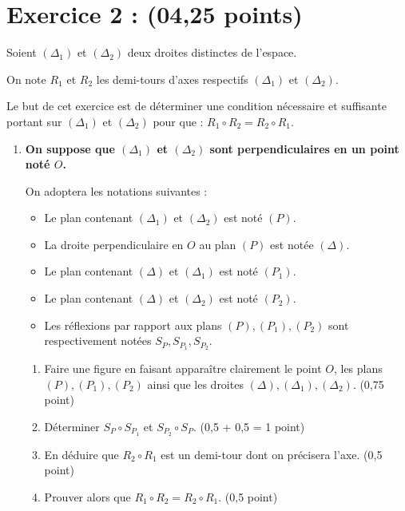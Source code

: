 \documentclass[11pt]{article}
\begin{document}
\section*{Exercice 2 :  (04,25 points)}

Soient \( (\Delta_1) \) et \( (\Delta_2) \) deux droites distinctes de l’espace.

\noindent
On note \( R_1 \) et \( R_2 \) les demi-tours d’axes respectifs \( (\Delta_1) \) et \( (\Delta_2) \).

\medskip
Le but de cet exercice est de déterminer une condition nécessaire et suffisante portant sur \( (\Delta_1) \) et \( (\Delta_2) \) pour que : \( R_1 \circ R_2 = R_2 \circ R_1. \)

\begin{enumerate}
\item \textbf{On suppose que \( (\Delta_1) \) et \( (\Delta_2) \) sont perpendiculaires en un point noté \( O \).}

On adoptera les notations suivantes :
\begin{itemize}
    \item Le plan contenant \( (\Delta_1) \) et \( (\Delta_2) \) est noté \( (P) \).
    \item La droite perpendiculaire en \( O \) au plan \( (P) \) est notée \( (\Delta) \).
    \item Le plan contenant \( (\Delta) \) et \( (\Delta_1) \) est noté \( (P_1) \).
    \item Le plan contenant \( (\Delta) \) et \( (\Delta_2) \) est noté \( (P_2) \).
    \item Les réflexions par rapport aux plans \( (P), (P_1), (P_2) \) sont respectivement notées \( S_P, S_{P_1}, S_{P_2} \).
\end{itemize}

\begin{enumerate}[label=\alph*)]
    \item Faire une figure en faisant apparaître clairement le point \( O \), les plans \( (P), (P_1), (P_2) \) ainsi que les droites \( (\Delta), (\Delta_1), (\Delta_2) \). \hfill (0,75 point)

    \item Déterminer \( S_P \circ S_{P_1} \) et \( S_{P_2} \circ S_P \). \hfill (0,5 + 0,5 = 1 point)

    \item En déduire que \( R_2 \circ R_1 \) est un demi-tour dont on précisera l’axe. \hfill (0,5 point)

    \item Prouver alors que \( R_1 \circ R_2 = R_2 \circ R_1 \). \hfill (0,5 point)
\end{enumerate}


\end{enumerate}
\end{document}
